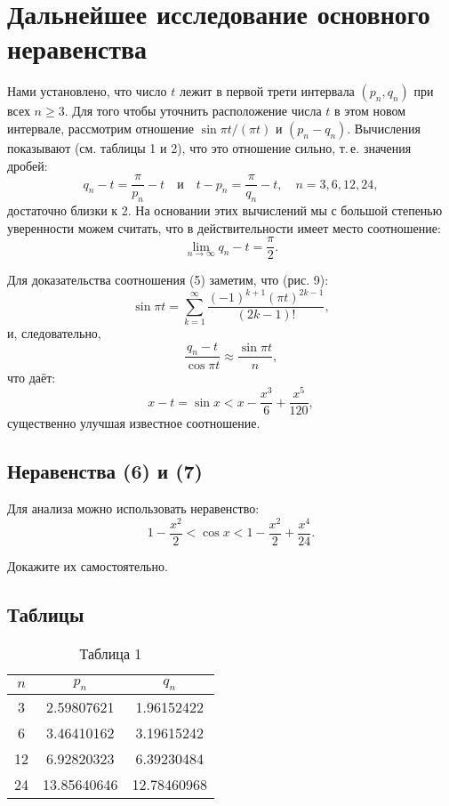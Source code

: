 \documentclass[a4paper,12pt]{article}
\begin{document}
\section*{Дальнейшее исследование основного неравенства}

Нами установлено, что число $t$ лежит в первой трети интервала $(p_n, q_n)$ при всех $n \geq 3$. Для того чтобы уточнить расположение числа $t$ в этом новом интервале, рассмотрим отношение $\sin \pi t / (\pi t)$ и $(p_n - q_n)$. Вычисления показывают (см. таблицы 1 и 2), что это отношение сильно, т.\,е. значения дробей:
$$ q_n - t = \frac{\pi}{p_n} - t \quad \text{и} \quad t - p_n = \frac{\pi}{q_n} - t, \quad n = 3, 6, 12, 24, $$
достаточно близки к 2. На основании этих вычислений мы с большой степенью уверенности можем считать, что в действительности имеет место соотношение:
$$ \lim_{n \to \infty} q_n - t = \frac{\pi}{2}. \tag{5} $$

Для доказательства соотношения (5) заметим, что (рис. 9):
$$ \sin \pi t = \sum_{k=1}^\infty \frac{(-1)^{k+1}(\pi t)^{2k-1}}{(2k-1)!}, $$
и, следовательно,
$$ \frac{q_n - t}{\cos \pi t} \approx \frac{\sin \pi t}{n}, $$
что даёт:
$$ x - t = \sin x < x - \frac{x^3}{6} + \frac{x^5}{120}, \tag{6} $$
существенно улучшая известное соотношение.

\subsection*{Неравенства (6) и (7)}
Для анализа можно использовать неравенство:
$$ 1 - \frac{x^2}{2} < \cos x < 1 - \frac{x^2}{2} + \frac{x^4}{24}. \tag{7} $$

Докажите их самостоятельно.

\subsection*{Таблицы}

\begin{table}[H]
\centering
\caption{Таблица 1}
\begin{tabular}{|c|c|c|}
\hline
$n$ & $p_n$ & $q_n$ \\ \hline
3   & 2.59807621 & 1.96152422 \\ \hline
6   & 3.46410162 & 3.19615242 \\ \hline
12  & 6.92820323 & 6.39230484 \\ \hline
24  & 13.85640646 & 12.78460968 \\ \hline
\end{tabular}
\end{table}
\end{document}
